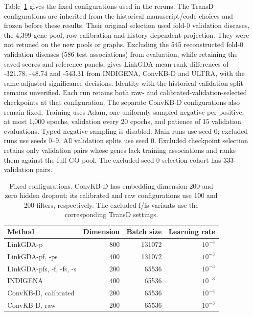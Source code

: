 \documentclass{article}
\begin{document}
Table~\ref{tab:configurations} gives the fixed configurations used in the
reruns. The TransD configurations are inherited from the historical manuscript/code
choices and frozen before these results. Their original selection used fold-0
validation diseases, the 4,399-gene pool, row calibration and history-dependent
projection. They were not retuned on the new pools or graphs. Excluding the
545 reconstructed fold-0 validation diseases (586 test associations) from
evaluation, while retaining the saved scores and reference panels, gives
LinkGDA mean-rank differences of -321.78, -48.74 and -543.31 from INDIGENA,
ConvKB-D and ULTRA, with the same adjusted significance decisions. Identity
with the historical validation split remains unverified. Each run retains
both raw- and calibrated-validation-selected checkpoints at that configuration.
The separate ConvKB-D configurations also remain fixed. Training uses Adam,
one uniformly sampled negative per positive, at most 1,000 epochs, validation
every 20 epochs, and patience of 15 validation evaluations. Typed negative
sampling is disabled. Main runs use seed 0; excluded runs use seeds 0--9.
All validation splits use seed 0. Excluded checkpoint selection retains only
validation pairs whose genes lack training associations and ranks them against
the full GO pool. The excluded seed-0 selection cohort has 333 validation pairs.

\begin{table}[htbp]
\centering\small
\caption{Fixed configurations. ConvKB-D has embedding dimension 200 and zero
hidden dropout; its calibrated and raw configurations use 100 and 200 filters,
respectively. The excluded f/fs variants use the corresponding TransD settings.}
\label{tab:configurations}
\begin{tabular}{lrrr}
\toprule
Method & Dimension & Batch size & Learning rate\\
\midrule
LinkGDA-p & 800 & 131072 & $10^{-4}$\\
LinkGDA-pf, -ps & 400 & 131072 & $10^{-3}$\\
LinkGDA-pfs, -f, -fs, -s & 200 & 65536 & $10^{-3}$\\
INDIGENA & 400 & 65536 & $10^{-3}$\\
ConvKB-D, calibrated & 200 & 65536 & $10^{-4}$\\
ConvKB-D, raw & 200 & 65536 & $10^{-3}$\\
\bottomrule
\end{tabular}
\end{table}
\end{document}
